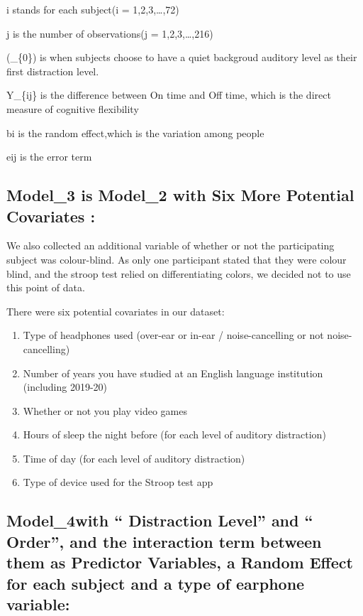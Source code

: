 \documentclass[]{article}
\providecommand{\tightlist}{%
  \setlength{\itemsep}{0pt}\setlength{\parskip}{0pt}}
\begin{document}
i stands for each subject(i = 1,2,3,\ldots,72)

j is the number of observations(j = 1,2,3,\ldots,216)

(\beta\_\{0\}) is when subjects choose to have a quiet backgroud
auditory level as their first distraction level.

Y\_\{ij\} is the difference between On time and Off time, which is the
direct measure of cognitive flexibility

bi is the random effect,which is the variation among people

eij is the error term

\hypertarget{model_3-is-model_2-with-six-more-potential-covariates}{%
\subsection{Model\_3 is Model\_2 with Six More Potential Covariates
:}\label{model_3-is-model_2-with-six-more-potential-covariates}}

We also collected an additional variable of whether or not the
participating subject was colour-blind. As only one participant stated
that they were colour blind, and the stroop test relied on
differentiating colors, we decided not to use this point of data.

There were six potential covariates in our dataset:

\begin{enumerate}
\def\labelenumi{\arabic{enumi}.}
\tightlist
\item
  Type of headphones used (over-ear or in-ear / noise-cancelling or not
  noise-cancelling)
\item
  Number of years you have studied at an English language institution
  (including 2019-20)
\item
  Whether or not you play video games
\item
  Hours of sleep the night before (for each level of auditory
  distraction)
\item
  Time of day (for each level of auditory distraction)
\item
  Type of device used for the Stroop test app
\end{enumerate}

\hypertarget{model_4with-distraction-level-and-order-and-the-interaction-term-between-them-as-predictor-variables-a-random-effect-for-each-subject-and-a-type-of-earphone-variable}{%
\subsection{Model\_4with `` Distraction Level'' and `` Order'', and the
interaction term between them as Predictor Variables, a Random Effect
for each subject and a type of earphone
variable:}\label{model_4with-distraction-level-and-order-and-the-interaction-term-between-them-as-predictor-variables-a-random-effect-for-each-subject-and-a-type-of-earphone-variable}}
\end{document}
